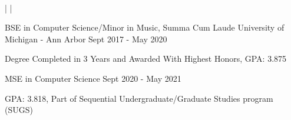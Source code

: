 \documentclass[]{awesome-cv}
\begin{document}
    
\begin{center}
	   \\

	{} | {} | {}
\end{center}
\vspace{-4mm}
\vspace{-2mm}
\cventry
	{BSE in Computer Science/Minor in Music, Summa Cum Laude}
	{University of Michigan - Ann Arbor}
	{}
	{Sept 2017 - May 2020}
	{\begin{cvitems}
		\item{Degree Completed in 3 Years and Awarded With Highest Honors, GPA: 3.875}
		\end{cvitems}}

\vspace{-5mm}
\cventry
	{MSE in Computer Science}
	{}
	{}
	{Sept 2020 - May 2021}
	{\begin{cvitems}
		\item{GPA: 3.818, Part of Sequential Undergraduate/Graduate Studies program (SUGS)}
		\end{cvitems}}


\vspace{-6mm}
\vspace{-2mm}

	
\end{document}
